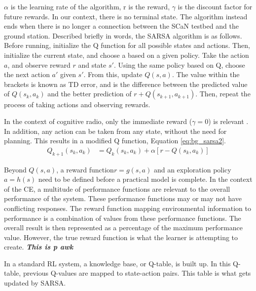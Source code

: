 		\par $\alpha$ is the learning rate of the algorithm, r is the reward, $\gamma$ is the discount factor for future rewards. In our context, there is no terminal state. The algorithm instead ends when there is no longer a connection between the SCaN testbed and the ground station. Described briefly in words, the SARSA algorithm is as follows. Before running, initialize the Q function for all possible states and actions. Then, initialize the current state, and choose a based on a given policy. Take the action $a$, and observe reward $r$ and state $s'$. Using the same policy based on Q, choose the next action $a'$ given $s'$. From this, update $Q(s,a)$. The value within the brackets is known as TD error, and is the difference between the predicted value of $Q(s_k,a_k)$ and the better prediction of $r + Q(s_{k+1},a_{k+1})$. Then, repeat the process of taking actions and observing rewards. 
	\par In the context of cognitive radio, only the immediate reward ($\gamma = 0$) is relevant \cite{AIAA_Paper}. In addition, any action can be taken from any state, without the need for planning. This results in a modified Q function, Equation \ref{eq:bg_sarsa2}.
	\begin{align}
		Q_{k+1}(s_k,a_k) &= Q_k(s_k,a_k) + \alpha[r - Q(s_k,a_k)] \label{eq:bg_sarsa2}
	\end{align}
	\par Beyond $Q(s,a)$, a reward function$r = g(s,a)$ and an exploration policy $a = h(s)$ need to be defined before a practical model is complete. In the context of the CE, a multitude of performance functions are relevant to the overall performance of the system. These performance functions may or may not have conflicting responses. The reward function mapping environmental information to performance is a combination of values from these performance functions. The overall result is then represented as a percentage of the maximum performance value. However, the true reward function is what the learner is attempting to create. \textbf{\textit{ This is p awk}}  
	\par In a standard RL system, a knowledge base, or Q-table, is built up. In this Q-table, previous Q-values are mapped to state-action pairs. This table is what gets updated by SARSA. 
	
